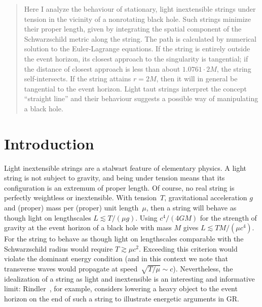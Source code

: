 
\date{Received: date / Accepted: date}


\maketitle

\begin{abstract}

  Here I analyze the behaviour of stationary, light inextensible strings
under tension in the vicinity of a nonrotating black hole.  Such
strings minimize their proper length, given by integrating the spatial
component of the Schwarzschild metric along the string.  The path is
calculated by numerical solution to the Euler-Lagrange equations.  If
the string is entirely outside the event horizon, its closest approach
to the singularity is tangential; if the distance of closest
approach is less than about $1.0761\cdot 2M$, the
string self-intersects.  If the string attains $r=2M$, then it
will in general be tangential to the event horizon.  Light taut
strings interpret the concept ``straight line'' and their behaviour
suggests a possible way of manipulating a black hole.
\end{abstract}

\section{Introduction}

Light inextensible strings are a stalwart feature of elementary
physics.  A light string is not subject to gravity, and being under
tension means that its configuration is an extremum of proper length.
Of course, no real string is perfectly weightless or inextensible.
With tension~$T$, gravitational acceleration $g$ and (proper) mass per
(proper) unit length~$\mu$, then a string will behave as though light
on lengthscales $L\lesssim T/\left(\mu g\right)$.  Using
$c^4/\left(4GM\right)$ for the strength of gravity at the event
horizon of a black hole with mass $M$ gives $L\lesssim TM/\left(\mu
c^4\right)$.  For the string to behave as though light on lengthscales
comparable with the Schwarzschild radius would require $T\gtrsim\mu
c^2$.  Exceeding this criterion would violate the dominant energy
condition (and in this context we note that transverse waves would
propagate at speed~$\sqrt{T/\mu}\sim c$).  Nevertheless, the
idealization of a string as light and inextensible is an interesting
and informative limit: Rindler~\cite{rindler}, for example, considers
lowering a heavy object to the event horizon on the end of such a
string to illustrate energetic arguments in GR.

